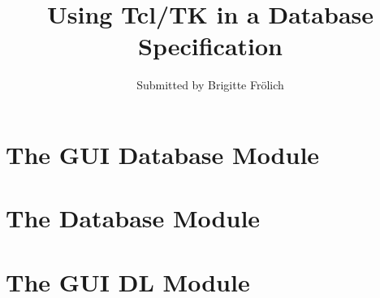 \documentclass{article}
\begin{document}
\title{Using Tcl/TK in a Database Specification}
\author{Submitted by Brigitte Fr\"{o}lich}
\maketitle

\section{The GUI Database Module}

\begin{vdm}

\end{vdm}

\section{The Database Module}

\begin{vdm}

\end{vdm}

\section{The GUI DL Module}

\begin{vdm}

\end{vdm}

\printindex
\end{document}
